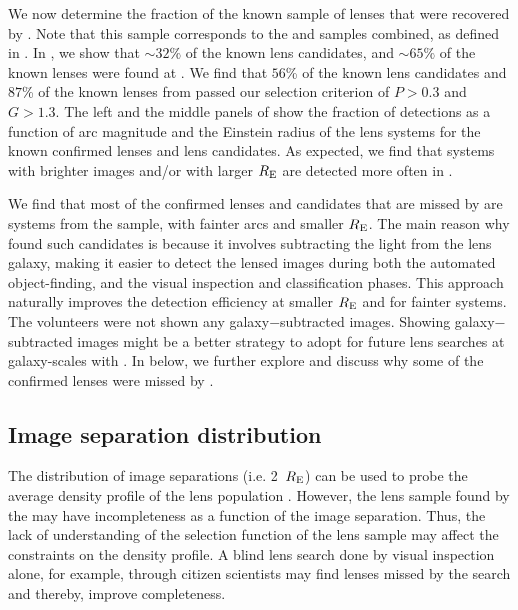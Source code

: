 \documentclass[useAMS,usenatbib,a4paper]{mn2e}
\begin{document}
We now determine the fraction of the known sample of lenses that were
recovered by \sw. Note that this sample corresponds to the \rf and \af
samples combined, as defined in . In
, we show that $\sim32\%$ of the known lens candidates,
and $\sim65\%$ of the known lenses were found at \StageOne. We find that
$56$\% of the known lens candidates and $87$\% of the known lenses from
\StageOne passed our \StageTwo selection criterion of $P>0.3$ and
$G>1.3$. The left and the middle panels of  show the
fraction of detections as a function of arc magnitude and the Einstein
radius of the lens systems for the known confirmed lenses and lens
candidates. As expected, we find that systems with brighter images
and/or with larger $R_{\rm E}$ are detected more often in \sw.

We find that most of the confirmed lenses and candidates that are missed
by \sw are systems from the \rf sample, with fainter arcs and smaller $R_{\rm E}$.
The main reason why \rf found such candidates
is because it involves subtracting the light from the lens galaxy,
making it easier to detect the lensed images during both the automated
object-finding, and the visual inspection and classification
phases. This approach naturally improves the detection
efficiency at smaller $R_{\rm E}$ and for fainter systems. The \sw
volunteers were not shown any galaxy$-$subtracted images. Showing
galaxy$-$subtracted images might be a better strategy to adopt for future
lens searches at galaxy-scales with \sw. In
 below, we further explore and discuss why some of the confirmed
lenses were missed by \sw.



\subsection{Image separation distribution}
\label{sec:results:isd}

The distribution of image separations (i.e. 2~$R_{\rm E}$)
can be used to probe the average density profile of the lens population
\citep{Oguri2006,More2012}.  However, the lens sample found by the \af
may have incompleteness as a function of the image separation. Thus, the
lack of understanding of the selection function of the lens sample may
affect the constraints on the density profile. A blind lens search done
by visual inspection alone, for example, through \sw citizen scientists may find
lenses missed by the \af search and thereby, improve completeness.
\end{document}
